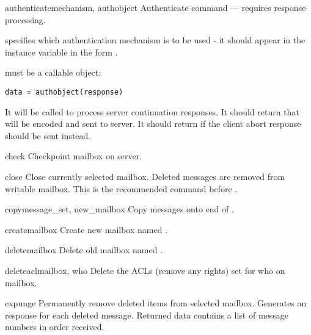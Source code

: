 \begin{methoddesc}{authenticate}{mechanism, authobject}
  Authenticate command --- requires response processing.

   specifies which authentication mechanism is to
  be used - it should appear in the instance variable  in the
  form .

   must be a callable object:

\begin{verbatim}
data = authobject(response)
\end{verbatim}

  It will be called to process server continuation responses.
  It should return  that will be encoded and sent to server.
  It should return  if the client abort response \samp{*} should
  be sent instead.
\end{methoddesc}

\begin{methoddesc}{check}{}
  Checkpoint mailbox on server. 
\end{methoddesc}

\begin{methoddesc}{close}{}
  Close currently selected mailbox. Deleted messages are removed from
  writable mailbox. This is the recommended command before
  .
\end{methoddesc}

\begin{methoddesc}{copy}{message_set, new_mailbox}
  Copy  messages onto end of . 
\end{methoddesc}

\begin{methoddesc}{create}{mailbox}
  Create new mailbox named .
\end{methoddesc}

\begin{methoddesc}{delete}{mailbox}
  Delete old mailbox named .
\end{methoddesc}

\begin{methoddesc}{deleteacl}{mailbox, who}
  Delete the ACLs (remove any rights) set for who on mailbox.
\end{methoddesc}

\begin{methoddesc}{expunge}{}
  Permanently remove deleted items from selected mailbox. Generates an
   response for each deleted message. Returned data
  contains a list of  message numbers in order
  received.
\end{methoddesc}

